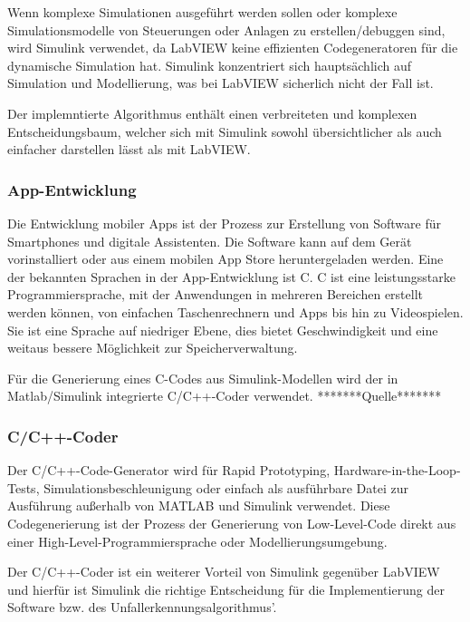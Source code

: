 
Wenn komplexe Simulationen ausgeführt werden sollen oder komplexe Simulationsmodelle von Steuerungen oder Anlagen zu erstellen/debuggen sind, wird Simulink verwendet, da LabVIEW keine effizienten Codegeneratoren für die dynamische Simulation hat.
Simulink konzentriert sich hauptsächlich auf Simulation und Modellierung, was bei LabVIEW sicherlich nicht der Fall ist.

Der implemntierte Algorithmus enthält einen verbreiteten und komplexen Entscheidungsbaum, welcher sich mit Simulink sowohl übersichtlicher als auch einfacher darstellen lässt als mit LabVIEW.



\subsubsection{App-Entwicklung}
Die Entwicklung mobiler Apps ist der Prozess zur Erstellung von Software für Smartphones und digitale Assistenten. Die Software kann auf dem Gerät vorinstalliert oder aus einem mobilen App Store heruntergeladen werden. Eine der bekannten Sprachen in der App-Entwicklung ist C.
C ist eine leistungsstarke Programmiersprache, mit der Anwendungen in mehreren Bereichen erstellt werden können, von einfachen Taschenrechnern und Apps bis hin zu Videospielen. Sie ist eine Sprache auf niedriger Ebene, dies bietet Geschwindigkeit und eine weitaus bessere Möglichkeit zur Speicherverwaltung.

Für die Generierung eines C-Codes aus Simulink-Modellen wird der in Matlab/Simulink integrierte C/C++-Coder verwendet. *******Quelle******* %

\subsubsection{C/C++-Coder}
Der C/C++-Code-Generator wird für Rapid Prototyping, Hardware-in-the-Loop-Tests, Simulationsbeschleunigung oder einfach als ausführbare Datei zur Ausführung außerhalb von MATLAB und Simulink verwendet.
Diese Codegenerierung ist der Prozess der Generierung von Low-Level-Code direkt aus einer High-Level-Programmiersprache oder Modellierungsumgebung.

Der C/C++-Coder ist ein weiterer Vorteil von Simulink gegenüber LabVIEW und hierfür ist Simulink die richtige Entscheidung für die Implementierung der Software bzw. des Unfallerkennungsalgorithmus'.
